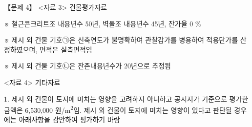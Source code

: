 \begin{longquestion}{【문제 4】}
<자료 3> 건물평가자료 \par
{\small\centering
{}\par}

※ 철근콘크리트조 내용년수 50년, 벽돌조 내용년수 45년, 잔가율 0 \% \par
※ 제시 외 건물 기호㉠은 신축연도가 불명확하여 관찰감가를 병용하여 적용단가를 산정하였으며, 면적은 실측면적임 \par
※ 제시 외 건물 기호㉡은 잔존내용년수가 20년으로 추정됨 \par
<자료 4> 기타자료 \par
1. 제시 외 건물이 토지에 미치는 영향을 고려하지 아니하고 공시지가 기준으로 평가한 금액은 6,530,000 원/m\textsuperscript{2}임. 제시 외 건물이 토지에 미치는 영향이 있다고 판단될 경우에는 아래사항을 감안하여 평가하기 바람 \par
{\small\centering
{}\par}

\end{longquestion}

